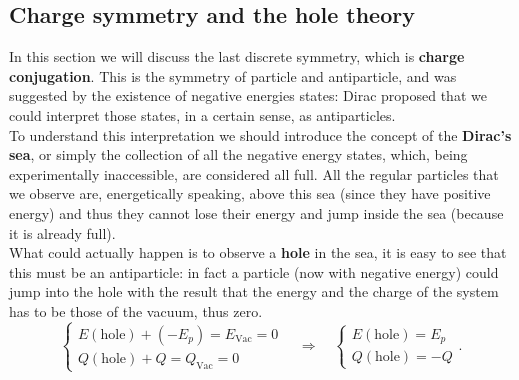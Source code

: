 \subsection{Charge symmetry and the hole theory}
In this section we will discuss the last discrete symmetry, which is \textbf{charge conjugation}. This is the symmetry of particle and antiparticle, and was suggested by the existence of negative energies states: Dirac proposed that we could interpret those states, in a certain sense, as antiparticles.\\

To understand this interpretation we should introduce the concept of the \textbf{Dirac's sea}, or simply the collection of all the negative energy states, which, being experimentally inaccessible, are considered all full. All the regular particles that we observe are, energetically speaking, above this sea (since they have positive energy) and thus they cannot lose their energy and jump inside the sea (because it is already full).\\What could actually happen is to observe a \textbf{hole} in the sea, it is easy to see that this must be an antiparticle: in fact a particle (now with negative energy) could jump into the hole with the result that the energy and the charge of the system has to be those of the vacuum, thus zero.
\begin{equation*}
    \begin{cases}
        E(\text{hole})+(-E_p)=E_\text{Vac}=0\\
        Q(\text{hole})+Q=Q_{\text{Vac}}=0
    \end{cases}\quad\Rightarrow\quad\begin{cases}
        E(\text{hole})=E_p\\
        Q(\text{hole})=-Q
    \end{cases}.
\end{equation*} 
